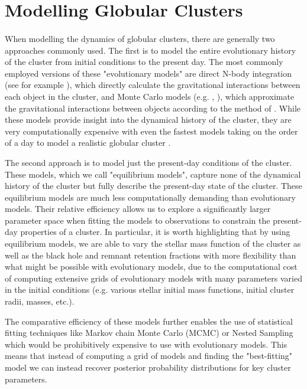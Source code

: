 \section{Modelling Globular Clusters}

\paragraph{}


When modelling the dynamics of globular clusters, there are generally two approaches commonly used.
The first is to model the entire evolutionary history of the cluster from initial conditions to the
present day. The most commonly employed versions of these "evolutionary models" are direct N-body
integration (see for example \citealt{Baumgardt2017a}), which directly calculate the gravitational
interactions between each object in the cluster, and Monte Carlo models (e.g.
\citealt{Rodriguez2021}, \citealt{Hypki2013}), which approximate the gravitational interactions
between objects according to the method of \citet{Henon1971}. While these models provide insight
into the dynamical history of the cluster, they are very computationally expensive with even the
fastest models taking on the order of a day to model a realistic globular cluster
\citep{Rodriguez2021}.

The second approach is to model just the present-day conditions of the cluster. These models, which
we call "equilibrium models", capture none of the dynamical history of the cluster but fully
describe the present-day state of the cluster. These equilibrium models are much less
computationally demanding than evolutionary models. Their relative efficiency allows us to explore a
significantly larger parameter space when fitting the models to observations to constrain the
present-day properties of a cluster. In particular, it is worth highlighting that by using
equilibrium models, we are able to vary the stellar mass function of the cluster as well as the
black hole and remnant retention fractions with more flexibility than what might be possible with
evolutionary models, due to the computational cost of computing extensive grids of evolutionary
models with many parameters varied in the initial conditions (e.g. various stellar initial mass
functions, initial cluster radii, masses, etc.).

The comparative efficiency of these models further enables the use of statistical fitting techniques
like Markov chain Monte Carlo (MCMC) or Nested Sampling which would be prohibitively expensive to use with evolutionary models.
This means that instead of computing a grid of models and finding the "best-fitting" model we can
instead recover posterior probability distributions for key cluster parameters.


